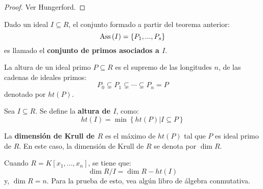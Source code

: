 \documentclass[12pt]{report}
\newcounter{it}
\theoremstyle{largebreak}
\newcommand{\Ass}[1]{\ensuremath{\textup{Ass}\left(#1\right)}}
\begin{document}
    \begin{proof}
        Ver Hungerford.
    \end{proof}

    \begin{mydef}
        Dado un ideal $I\subseteq R$, el conjunto formado a partir del teorema anterior:
        \begin{equation*}
            \Ass{I}=\left\{P_1,...,P_s \right\}
        \end{equation*}
        es llamado el \textbf{conjunto de primos asociados a $I$}.
    \end{mydef}

    \begin{mydef}
        La altura de un ideal primo $P\subseteq R$ es el supremo de las longitudes $n$, de las cadenas de ideales primos:
        \begin{equation*}
            P_0\subsetneq P_1\subsetneq\cdots\subsetneq P_n=P
        \end{equation*}
        denotado por $ht(P)$.
    \end{mydef}

    \begin{mydef}
        Sea $I\subseteq R$. Se define la \textbf{altura de $I$}, como:
        \begin{equation*}
            ht(I)=\min\left\{ht(P)\Big|I\subseteq P \right\}
        \end{equation*}
    \end{mydef}

    \begin{mydef}
        La \textbf{dimensión de Krull de $R$} es el máximo de $ht(P)$ tal que $P$ es ideal primo de $R$. En este caso, la dimensión de Krull de $R$ se denota por $\dim R$.
    \end{mydef}

    Cuando $R=K[x_1,...,x_n]$, se tiene que:
    \begin{equation*}
        \dim R/I=\dim R-ht(I)
    \end{equation*}
    y, $\dim R=n$. Para la prueba de esto, vea algún libro de álgebra conmutativa.
\end{document}
